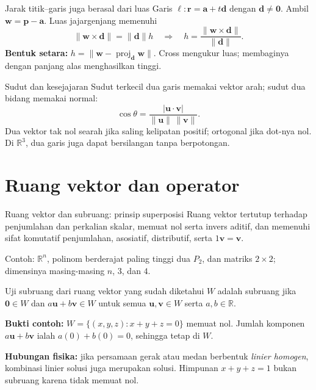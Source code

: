 \documentclass[11pt,aspectratio=169]{beamer}
\newcommand{\vect}[1]{\boldsymbol{#1}}
\newcommand{\R}{\mathbb{R}}
\DeclareMathOperator{\proj}{proj}
\begin{document}
\begin{frame}{Jarak titik--garis juga berasal dari luas}
\small
Garis $\ell:\vect{r}=\vect{a}+t\vect{d}$ dengan $\vect{d}\ne\vect{0}$.
Ambil $\vect{w}=\vect{p}-\vect{a}$. Luas jajargenjang memenuhi
\[
\|\vect{w}\times\vect{d}\|=\|\vect{d}\|h
\quad\Longrightarrow\quad
\boxed{h=\frac{\|\vect{w}\times\vect{d}\|}{\|\vect{d}\|}}.
\]
\textbf{Bentuk setara:} $h=\|\vect{w}-\proj_{\vect{d}}\vect{w}\|$.
Cross mengukur luas; membaginya dengan panjang alas menghasilkan tinggi.
\begin{block}{Sudut dan kesejajaran}
Sudut terkecil dua garis memakai vektor arah; sudut dua bidang memakai normal:
\[
\cos\theta=\frac{|\vect{u}\cdot\vect{v}|}{\|\vect{u}\|\,\|\vect{v}\|}.
\]
Dua vektor tak nol searah jika saling kelipatan positif; ortogonal jika dot-nya nol.
Di $\R^3$, dua garis juga dapat bersilangan tanpa berpotongan.
\end{block}
\end{frame}

\section{Ruang vektor dan operator}

\begin{frame}{Ruang vektor dan subruang: prinsip superposisi}
\small
Ruang vektor tertutup terhadap penjumlahan dan perkalian skalar, memuat nol
serta invers aditif, dan memenuhi sifat komutatif penjumlahan, asosiatif,
distributif, serta $1\vect{v}=\vect{v}$.
\medskip

Contoh: $\R^n$, polinom berderajat paling tinggi dua $P_2$, dan matriks
$2\times2$; dimensinya masing-masing $n$, $3$, dan $4$.
\begin{block}{Uji subruang dari ruang vektor yang sudah diketahui}
$W$ adalah subruang jika $\vect{0}\in W$ dan
$a\vect{u}+b\vect{v}\in W$ untuk semua $\vect{u},\vect{v}\in W$ serta $a,b\in\R$.
\end{block}
\textbf{Bukti contoh:} $W=\{(x,y,z):x+y+z=0\}$ memuat nol.
Jumlah komponen $a\vect{u}+b\vect{v}$ ialah $a(0)+b(0)=0$, sehingga tetap di $W$.
\medskip

\textbf{Hubungan fisika:} jika persamaan gerak atau medan berbentuk
\emph{linier homogen}, kombinasi linier solusi juga merupakan solusi.
Himpunan $x+y+z=1$ bukan subruang karena tidak memuat nol.
\end{frame}
\end{document}
